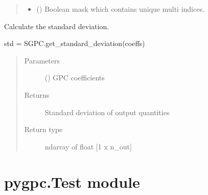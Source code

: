 \documentclass[letterpaper,10pt,english,openany,oneside]{sphinxmanual}
\begin{document}
\begin{fulllineitems}
\begin{fulllineitems}
\begin{quote}
\begin{description}
\begin{itemize}
\item {} 
 () \textendash{} Boolean mask which contains unique multi indices.

\end{itemize}


\end{description}\end{quote}

\end{fulllineitems}


\begin{fulllineitems}
\label{\detokenize{pygpc:pygpc.SGPC.SGPC.get_std}}
Calculate the standard deviation.

std = SGPC.get\_standard\_deviation(coeffs)
\begin{quote}\begin{description}
\item[{Parameters}] \leavevmode
{} (\sphinxstyleliteralemphasis{\sphinxupquote{ {[}}}\sphinxstyleliteralemphasis{\sphinxupquote{{]}}}) \textendash{} GPC coefficients

\item[{Returns}] \leavevmode
{} \textendash{} Standard deviation of output quantities

\item[{Return type}] \leavevmode
ndarray of float {[}1 x n\_out{]}

\end{description}\end{quote}

\end{fulllineitems}


\end{fulllineitems}



\section{pygpc.Test module}
\label{\detokenize{pygpc:module-pygpc.Test}}\label{\detokenize{pygpc:pygpc-test-module}}
\end{document}
